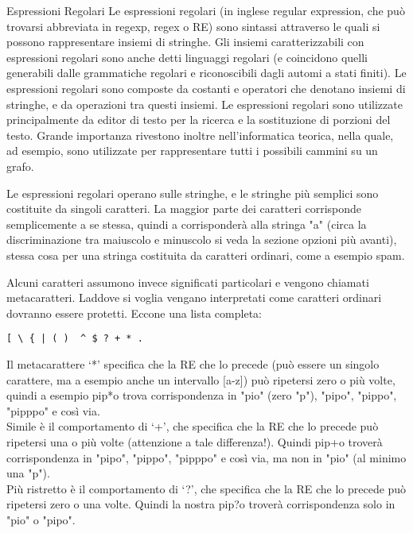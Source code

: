 \begin{subsubsection}{Espressioni Regolari}
 Le espressioni regolari (in inglese regular expression, che può trovarsi abbreviata in regexp, regex o RE) sono sintassi attraverso le quali si possono rappresentare insiemi di stringhe. Gli insiemi caratterizzabili con espressioni regolari sono anche detti linguaggi regolari (e coincidono quelli generabili dalle grammatiche regolari e riconoscibili dagli automi a stati finiti). Le espressioni regolari sono composte da costanti e operatori che denotano insiemi di stringhe, e da operazioni tra questi insiemi. Le espressioni regolari sono utilizzate principalmente da editor di testo per la ricerca e la sostituzione di porzioni del testo. Grande importanza rivestono inoltre nell'informatica teorica, nella quale, ad esempio, sono utilizzate per rappresentare tutti i possibili cammini su un grafo.

Le espressioni regolari operano sulle stringhe, e le stringhe più semplici sono costituite da singoli caratteri. La maggior parte dei caratteri corrisponde semplicemente a se stessa, quindi a corrisponderà alla stringa "a" (circa la discriminazione tra maiuscolo e minuscolo si veda la sezione opzioni più avanti), stessa cosa per una stringa costituita da caratteri ordinari, come a esempio spam.

Alcuni caratteri assumono invece significati particolari e vengono chiamati metacaratteri. Laddove si voglia vengano interpretati come caratteri ordinari dovranno essere protetti. Eccone una lista completa:

\begin{verbatim}
[ \ { | ( )  ^ $ ? + * .
\end{verbatim}

Il metacarattere `*' specifica che la RE che lo precede (può essere un singolo carattere, ma a esempio anche un intervallo [a-z]) può ripetersi zero o più volte, quindi a esempio pip*o trova corrispondenza in "pio" (zero "p"), "pipo", "pippo", "pipppo" e così via.\\

Simile è il comportamento di `+', che specifica che la RE che lo precede può ripetersi una o più volte (attenzione a tale differenza!). Quindi pip+o troverà corrispondenza in "pipo", "pippo", "pipppo" e così via, ma non in "pio" (al minimo una "p").\\

Più ristretto è il comportamento di `?', che specifica che la RE che lo precede può ripetersi zero o una volte. Quindi la nostra pip?o troverà corrispondenza solo in "pio" o "pipo".\\


\end{subsubsection}
